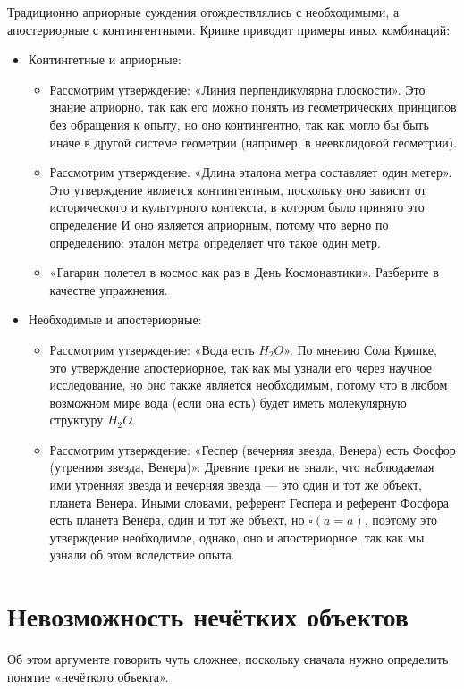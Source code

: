 \documentclass[openany]{book}
\theoremstyle{plain}
\theoremstyle{definition}
\begin{document}
Традиционно априорные суждения отождествлялись с необходимыми, а апостериорные с контингентными.
Крипке приводит примеры иных комбинаций:
\begin{itemize}
\item Контингетные и априорные:
	\begin{itemize}
		\item Рассмотрим утверждение: «Линия перпендикулярна плоскости». Это знание априорно, так как его можно понять из геометрических принципов без обращения к опыту, но оно контингентно, так как могло бы быть иначе в другой системе геометрии (например, в неевклидовой геометрии).
		\item Рассмотрим утверждение: «Длина эталона метра составляет один метер». Это утверждение является контингентным, поскольку оно зависит от исторического и культурного контекста, в котором было принято это определение И оно является априорным, потому что верно по определению: эталон метра определяет что такое один метр.
		\item «Гагарин полетел в космос как раз в День Космонавтики». Разберите в качестве упражнения.
	\end{itemize}
\item Необходимые и апостериорные:
	\begin{itemize}
		\item Рассмотрим утверждение: «Вода есть \(H_2 O\)». По мнению Сола Крипке, это утверждение апостериорное, так как мы узнали его через научное исследование, но оно также является необходимым, потому что в любом возможном мире вода (если она есть) будет иметь молекулярную структуру \(H_2 O\).
		\item Рассмотрим утверждение: «Геспер (вечерняя звезда, Венера) есть Фосфор (утренняя звезда, Венера)». Древние греки не знали, что наблюдаемая ими утренняя звезда и вечерняя звезда — это один и тот же объект, планета Венера. Иными словами, референт Геспера и референт Фосфора есть планета Венера, один и тот же объект, но \(\square(a = a)\), поэтому это утверждение необходимое, однако, оно и апостериорное, так как мы узнали об этом вследствие опыта.
	\end{itemize}
\end{itemize}


\section{Невозможность нечётких объектов}

Об этом аргументе говорить чуть сложнее, поскольку сначала нужно определить понятие «нечёткого объекта».
\end{document}
